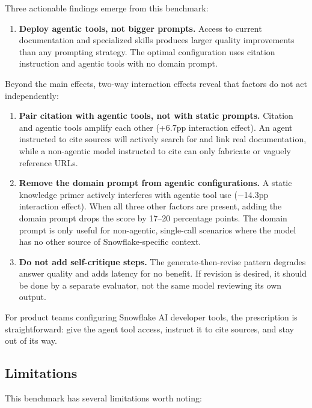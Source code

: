 \documentclass[11pt,letterpaper]{article}
\begin{document}
Three actionable findings emerge from this benchmark:

\begin{enumerate}[leftmargin=*]
  \item \textbf{Deploy agentic tools, not bigger prompts.} Access to current documentation and specialized skills produces larger quality improvements than any prompting strategy. The optimal configuration uses citation instruction and agentic tools with no domain prompt.
\end{enumerate}

Beyond the main effects, two-way interaction effects reveal that factors do not act independently:

\begin{enumerate}[leftmargin=*,resume]
  \item \textbf{Pair citation with agentic tools, not with static prompts.} Citation and agentic tools amplify each other (+6.7pp interaction effect). An agent instructed to cite sources will actively search for and link real documentation, while a non-agentic model instructed to cite can only fabricate or vaguely reference URLs.

  \item \textbf{Remove the domain prompt from agentic configurations.} A static knowledge primer actively interferes with agentic tool use ($-$14.3pp interaction effect). When all three other factors are present, adding the domain prompt drops the score by 17--20 percentage points. The domain prompt is only useful for non-agentic, single-call scenarios where the model has no other source of Snowflake-specific context.

  \item \textbf{Do not add self-critique steps.} The generate-then-revise pattern degrades answer quality and adds latency for no benefit. If revision is desired, it should be done by a separate evaluator, not the same model reviewing its own output.
\end{enumerate}

For product teams configuring Snowflake AI developer tools, the prescription is straightforward: give the agent tool access, instruct it to cite sources, and stay out of its way.

\subsection*{Limitations}

This benchmark has several limitations worth noting:
\end{document}
